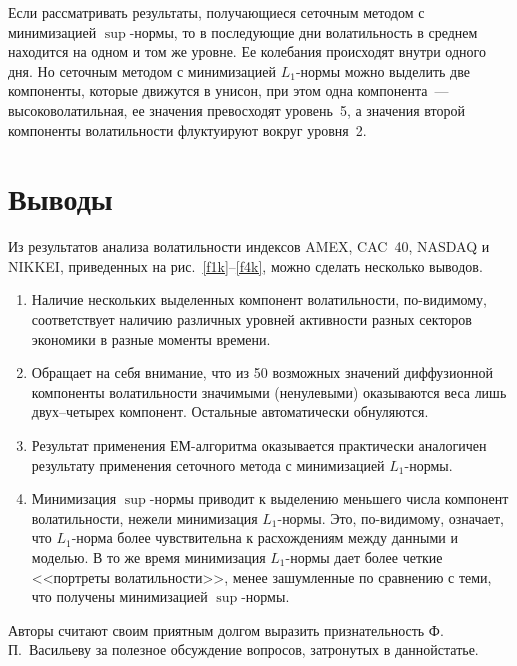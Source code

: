 \begin{multicols}{2}
Если рассматривать результаты, получающиеся сеточным методом с
минимизацией $\sup$-нормы, то в последующие дни волатильность в
среднем находится на одном и том же уровне. Ее колебания
происходят внутри одного дня. Но сеточным методом с минимизацией
$L_1$-нормы можно выделить две компоненты, которые движутся в
унисон, при этом одна компонента~--- высоковолатильная, ее значения
превосходят уровень~5, а значения второй компоненты
волатильности флуктуируют вокруг уровня~2.


\section{Выводы}

Из результатов анализа волатильности индексов AMEX, CAC~40, NASDAQ
и NIKKEI, приведенных на рис.~\ref{f1k}--\ref{f4k}, можно сделать несколько
выводов.
\begin{enumerate}[1.]
\item Наличие нескольких выделенных компонент волатильности,
по-видимому, соответствует наличию различных уровней активности
разных секторов экономики в разные моменты времени.
\item
Обращает на себя внимание, что из 50 возможных значений
диффузионной компоненты волатильности значимыми (ненулевыми)
оказываются веса лишь двух--четырех компонент. Остальные
автоматически обнуляются.
\item
Результат применения ЕМ-алгоритма оказывается практически
аналогичен результату применения сеточного метода с минимизацией
$L_1$-нор\-мы.
\item
Минимизация $\sup$-нормы приводит к выделению меньшего числа
компонент волатильности, нежели минимизация $L_1$-нормы. Это,\linebreak
по-ви\-ди\-мо\-му, означает, что $L_1$-норма более чувствительна к
расхождениям между данными и моделью. В то же время минимизация
$L_1$-нормы дает более четкие <<портреты волатильности>>, менее
зашумленные по сравнению с теми, что получены минимизацией
$\sup$-нормы.
\end{enumerate}

\bigskip
Авторы считают своим приятным долгом выразить признательность Ф.\,П.~Васильеву
за полезное обсуждение вопросов, затронутых в данной\linebreak статье.


{\small\frenchspacing
{%
\begin{thebibliography}{99}


\end{thebibliography}}}
\end{multicols}
